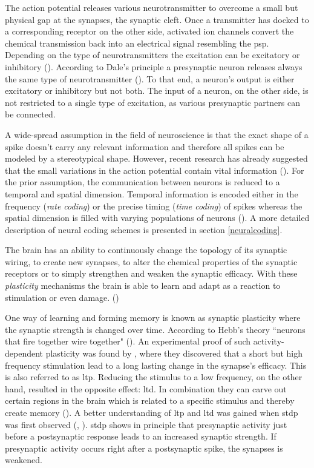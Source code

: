 The action potential releases various neurotransmitter to overcome a small but physical gap at the synapses, the synaptic cleft. Once a transmitter has docked to a corresponding receptor on the other side, activated ion channels convert the chemical transmission back into an electrical signal resembling the \gls{psp}. Depending on the type of neuro\-transmitters the excitation can be excitatory or inhibitory (\citealp{gerstner2014dynamics}). According to Dale's principle a presynaptic neuron releases always the same type of neurotransmitter (\citealp{dale1935pharmacology}). To that end, a neuron's output is either excitatory or inhibitory but not both. The input of a neuron, on the other side, is not restricted to a single type of excitation, as various presynaptic partners can be connected. 

A wide-spread assumption in the field of neuroscience is that the exact shape of a spike doesn't carry any relevant information and therefore all spikes can be modeled by a stereotypical shape. However, recent research has already suggested that the small variations in the action potential contain vital information (\citealp{debanne2013mechanisms}). For the prior assumption, the communication between neurons is reduced to a temporal and spatial dimension. Temporal information is encoded either in the frequency (\emph{rate coding}) or the precise timing (\emph{time coding}) of spikes whereas the spatial dimension is filled with varying populations of neurons (\citealp{gerstner2014dynamics}). A more detailed description of neural coding schemes is presented in section \ref{neuralcoding}.

The brain has an ability to continuously change the topology of its synaptic wiring, to create new synapses, to alter the chemical properties of the synaptic receptors or to simply strengthen and weaken the synaptic efficacy. With these \emph{plasticity} mechanisms the brain is able to learn and adapt as a reaction to stimulation or even damage. (\citealp{gerstner2014dynamics})

One way of learning and forming memory is known as synaptic plasticity where the synaptic strength is changed over time. According to Hebb's theory ``neurons that fire together wire together" (\citealp{hebb1949organization}). An experimental proof of such activity-dependent plasticity was found by \citealp{bliss1973long}, where they discovered that a short but high frequency stimulation lead to a long lasting change in the synapse's efficacy. This is also referred to as \gls{ltp}. Reducing the stimulus to a low frequency, on the other hand, resulted in the opposite effect: \gls{ltd}. In combination they can carve out certain regions in the brain which is related to a specific stimulus and thereby create memory (\citealp{nabavi2014engineering}). A better understanding of \gls{ltp} and \gls{ltd} was gained when \gls{stdp} was first observed (\citealp{markram1997regulation}, \citealp{poo98stdp}). \gls{stdp} shows in principle that presynaptic activity just before a postsynaptic response leads to an increased synaptic strength. If presynaptic activity occurs right after a postsynaptic spike, the synapses is weakened. 

